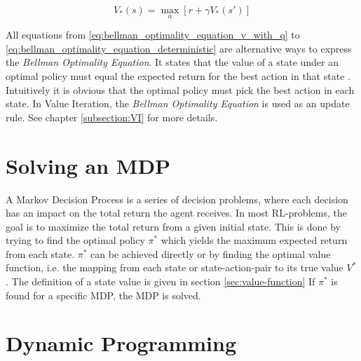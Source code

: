 \begin{equation}
V_*(s) = \max_a[r+\gamma V_*(s')]
\label{eq:bellman_optimality_equation_deterministic}
\end{equation}

All equations from \ref{eq:bellman_optimality_equation_v_with_q} to \ref{eq:bellman_optimality_equation_deterministic} are alternative ways to express the \textit{Bellman Optimality Equation}. It states that the value of a state under an optimal policy must equal the expected return for the best action in that state \cite{SuttonBarto2018}. Intuitively it is obvious that the optimal policy must pick the best action in each state. In Value Iteration, the \textit{Bellman Optimality Equation} is used as an update rule. See chapter \ref{subsection:VI} for more details.

\section{Solving an MDP}

A Markov Decision Process is a series of decision problems, where each decision has an impact on the total return the agent receives. In most RL-problems, the goal is to maximize the total return from a given initial state. This is done by trying to find the optimal policy $\pi^*$ which yields the maximum expected return from each state. $\pi^*$ can be achieved directly or by finding the optimal value function, i.e. the mapping from each state or state-action-pair to its true value $V^*$. The definition of a state value is given in section \ref{sec:value-function} If $\pi^*$ is found for a specific MDP, the MDP is solved.

\section{Dynamic Programming}
\label{chapter3}

